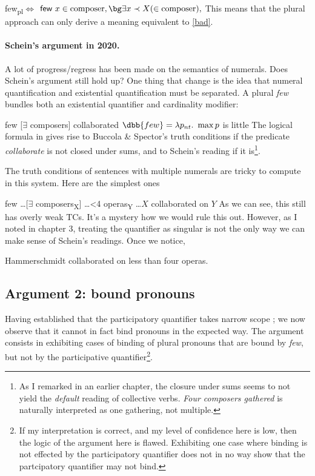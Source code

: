 \ex
 few\textsubscript{pl}$\Leftrightarrow$ $\textsf{few }x \in \text{composer}, {\bg \exists x\prec X (\in \text{composer})},$
\xe
%
This means that the plural approach can only derive a meaning equivalent to \cref{bad}.

\paragraph{Schein's argument in 2020.} 
A lot of progress/regress has been made on the semantics of numerals. Does Schein's argument still hold up? One thing that change is the idea that numeral quantification and existential quantification must be separated. A plural \emph{few} bundles both an existential quantifier and cardinality modifier:

\pex
\a 
few [$\exists$ composers] collaborated
\a 
$\dbb{few} = \lambda p_{nt}.\ \max p$ is little
\xe
%
The logical formula in \clastxa gives rise to Buccola \& Spector's truth conditions if the predicate \emph{collaborate} is not closed under sums, and to Schein's reading if it is\footnote{As I remarked in an earlier chapter, the closure under sums seems to not yield the \emph{default} reading of collective verbs. \emph{Four composers gathered} is naturally interpreted as one gathering, not multiple.}. 

The truth conditions of sentences with multiple numerals are tricky to compute in this system. Here are the simplest ones

\ex
few \ldots  [$\exists$ composers\textsubscript{X}]  \ldots <4 operas\textsubscript{Y} \ldots  $X$ collaborated on $Y$
\xe
%
As we can see, this still has overly weak TCs. It's a mystery how we would rule this out. However, as I noted in chapter 3, treating the quantifier as singular is not the only way we can make sense of Schein's readings. Once we notice,

\ex
Hammerschmidt collaborated on less than four operas.
\xe
%
\subsection{Argument 2: bound pronouns} %

Having established that the participatory quantifier takes narrow scope ; we now observe that it cannot in fact bind pronouns in the expected way.
The argument consists in exhibiting cases of binding of plural pronouns that are bound by \emph{few}, but not by the participative quantifier\footnote{If my interpretation is correct, and my level of confidence here is low, then the logic of the argument here is flawed. Exhibiting one case where binding is not effected by the participatory quantifier does not in no way show that the partcipatory quantifier may not bind.
}. 

